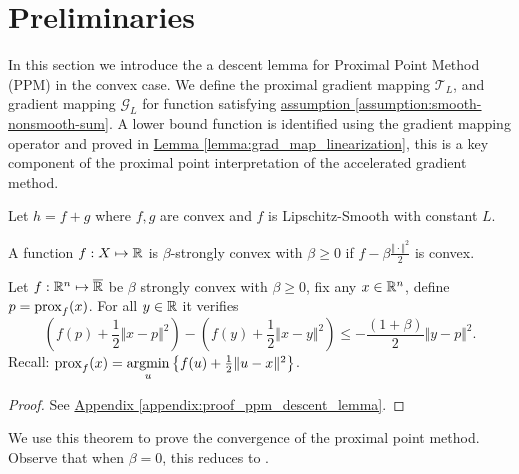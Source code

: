 \documentclass[12pt]{article}
\begin{document}
    
\section{Preliminaries}\label{sec:preliminaries}
    In this section we introduce the a descent lemma for Proximal Point Method (PPM) in the convex case. 
    We define the proximal gradient mapping $\mathcal T_L$, and gradient mapping $\mathcal G_L$ for function satisfying 
    \hyperref[assumption:smooth-nonsmooth-sum]
    {assumption \ref*{assumption:smooth-nonsmooth-sum}}. 
    A lower bound function is identified using the gradient mapping operator and proved in
    \hyperref[lemma:grad_map_linearization]{Lemma \ref*{lemma:grad_map_linearization}}, 
    this is a key component of the proximal point interpretation of the accelerated gradient method. 
    \begin{assumption}\label{assumption:smooth-nonsmooth-sum}
        Let $h = f + g$ where $f, g$ are convex and $f$ is Lipschitz-Smooth with constant $L$. 
    \end{assumption}
    \begin{definition}
        A function $f: X \mapsto \mathbb R$ is $\beta$-strongly convex
        with $\beta\geq 0$ if $f - \beta \frac{\Vert \cdot\Vert^2}{2}$ is convex.
    \end{definition}

    \begin{theorem}\label{thm:ppm_descent_ineq}
        Let $f: \mathbb R^n \mapsto \overline {\mathbb R}$ be $\beta$ strongly convex with $\beta \ge 0$, fix any $x \in \mathbb R^n$, define $p = \operatorname{prox}_f(x)$.
        For all $y \in \mathbb R$ it verifies
        $$
            \left(f(p) + \frac{1}{2}\Vert x - p\Vert^2\right)
            - 
            \left(
                f(y) + \frac{1}{2}\Vert x - y\Vert^2 
            \right)
            \le 
            - \frac{(1 + \beta)}{2}\Vert y - p\Vert^2. 
        $$
        Recall: $\operatorname{prox}_f(x) = \mathop{\rm argmin}\limits_{u}\left\lbrace f(u) + \frac{1}{2}\Vert u - x\Vert^2 \right\rbrace$. 
    \end{theorem}
    \begin{proof}
        See 
        \hyperref[appendix:proof_ppm_descent_lemma]
            {Appendix \ref*{appendix:proof_ppm_descent_lemma}}. 
    \end{proof}
    \begin{remark}
        We use this theorem to prove the convergence of the proximal point method. 
        Observe that when $\beta = 0$, this reduces to \cite[theorem 12.26]{bauschke_convex_2017}. 
    \end{remark}
 
\end{document}

